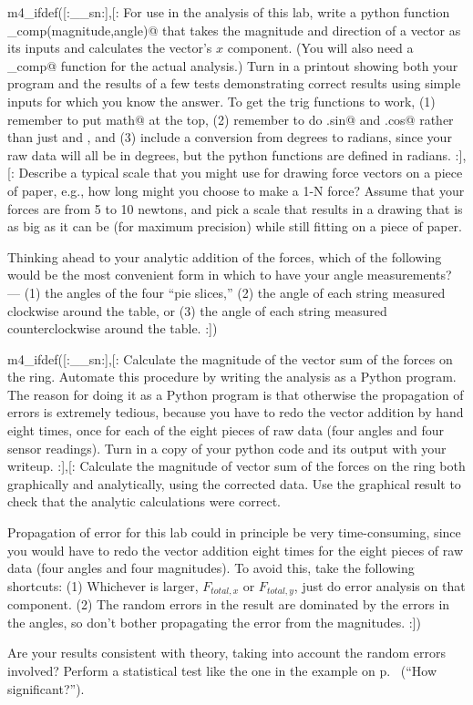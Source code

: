 \prelab

m4_ifdef([:__sn:],[:%
\prelabquestion For use in the analysis of this lab, write a python function \verb@x_comp(magnitude,angle)@ that
takes the magnitude and direction of a vector as its inputs and calculates the vector's $x$ component.
(You will also need a \verb@y_comp@ function for the actual analysis.)
Turn in a printout showing both your program and the results of a few tests demonstrating correct results
using simple inputs for which you know the answer.
To get the trig functions to work, (1) remember to put \verb@import math@ at the top, (2) remember to do \verb@math.sin@
and \verb@math.cos@ rather than just \verb@sin@ and \verb@cos@, and (3) include a conversion from degrees to radians, since
your raw data will all be in degrees, but the python functions are defined in radians.
:],[:%
\prelabquestion  Describe a typical scale that you might use for drawing
force vectors on a piece of paper, e.g., how long might you
choose to make a 1-N force?  Assume that your forces are
from 5 to 10 newtons, and pick a scale that results in a drawing that
is as big as it can be (for maximum precision) while still fitting on
a piece of paper.

\prelabquestion Thinking ahead to your analytic addition of the forces,
which of the following would be the most convenient form in which to have
your angle measurements? --- (1) the angles of the four ``pie slices,''
(2) the angle of each string measured clockwise around the table,
or (3) the angle of each string measured counterclockwise around the table.
:])

\analysis

m4_ifdef([:__sn:],[:%
Calculate the magnitude of the vector sum of the forces on the
ring. Automate this procedure by writing the analysis as a Python program.
The reason for doing it as a Python program is that otherwise the propagation of errors
is extremely tedious, because you have to redo the vector addition by hand eight times,
once for each of the eight pieces of raw data (four angles and four sensor readings).
Turn in a copy of your python code and its output with your writeup. 
:],[:%
Calculate the magnitude of vector sum of the forces on the
ring both graphically and analytically, using the corrected data. Use the
graphical result to check that the analytic calculations were correct.

Propagation of error for this lab could in principle be very time-consuming,
since you would have to redo the vector addition eight times for the eight
pieces of raw data (four angles and four magnitudes). 
To avoid this, take the following shortcuts: (1) Whichever is larger,
$F_{total,x}$ or $F_{total,y}$, just do error analysis on that component.
(2) The random errors in the result are dominated by the errors in the angles,
so don't bother propagating the error from the magnitudes.
:])

Are your results consistent with theory, taking into account
the random errors involved? Perform a statistical test like the
one in the example on p.~\pageref{eg:fine-structure} (``How significant?'').
